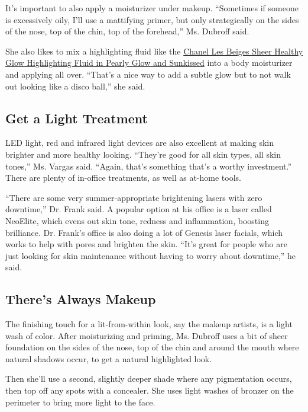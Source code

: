 It's important to also apply a moisturizer under makeup. ``Sometimes if
someone is excessively oily, I'll use a mattifying primer, but only
strategically on the sides of the nose, top of the chin, top of the
forehead,'' Ms. Dubroff said.

She also likes to mix a highlighting fluid like the
\href{https://www.chanel.com/us/makeup/p/186330/les-beiges-sheer-healthy-glow-highlighting-fluid/}{Chanel
Les Beiges Sheer Healthy Glow Highlighting Fluid in Pearly Glow and
Sunkissed} into a body moisturizer and applying all over. ``That's a
nice way to add a subtle glow but to not walk out looking like a disco
ball,'' she said.

\hypertarget{get-a-light-treatment}{%
\subsection{Get a Light Treatment}\label{get-a-light-treatment}}

LED light, red and infrared light devices are also excellent at making
skin brighter and more healthy looking. ``They're good for all skin
types, all skin tones,'' Ms. Vargas said. ``Again, that's something
that's a worthy investment.'' There are plenty of in-office treatments,
as well as at-home tools.

``There are some very summer-appropriate brightening lasers with zero
downtime,'' Dr. Frank said. A popular option at his office is a laser
called NeoElite, which evens out skin tone, redness and inflammation,
boosting brilliance. Dr. Frank's office is also doing a lot of Genesis
laser facials, which works to help with pores and brighten the skin.
``It's great for people who are just looking for skin maintenance
without having to worry about downtime,'' he said.

\hypertarget{theres-always-makeup}{%
\subsection{There's Always Makeup}\label{theres-always-makeup}}

The finishing touch for a lit-from-within look, say the makeup artists,
is a light wash of color. After moisturizing and priming, Ms. Dubroff
uses a bit of sheer foundation on the sides of the nose, top of the chin
and around the mouth where natural shadows occur, to get a natural
highlighted look.

Then she'll use a second, slightly deeper shade where any pigmentation
occurs, then top off any spots with a concealer. She uses light washes
of bronzer on the perimeter to bring more light to the face.

